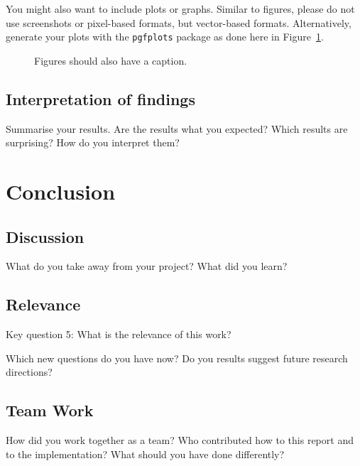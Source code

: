 \documentclass[a4paper,11pt]{article}
\begin{document}
You might also want to include plots or graphs.
Similar to figures, please do not use screenshots or pixel-based formats, but vector-based formats.
Alternatively, generate your plots with the \texttt{pgfplots} package as done here in Figure~\ref{fig1:plot}.

\begin{figure}[h]
  \centering
  \caption{Figures should also have a caption.}\label{fig1:plot}
\end{figure}

\subsection{Interpretation of findings}

Summarise your results.
Are the results what you expected?
Which results are surprising?
How do you interpret them?

\section{Conclusion}
\subsection{Discussion}

What do you take away from your project?
What did you learn?

\subsection{Relevance}

Key question 5: What is the relevance of this work?

Which new questions do you have now?
Do you results suggest future research directions?

\subsection{Team Work}

How did you work together as a team?
Who contributed how to this report and to the implementation?
What should you have done differently?

\printbibliography
\end{document}
